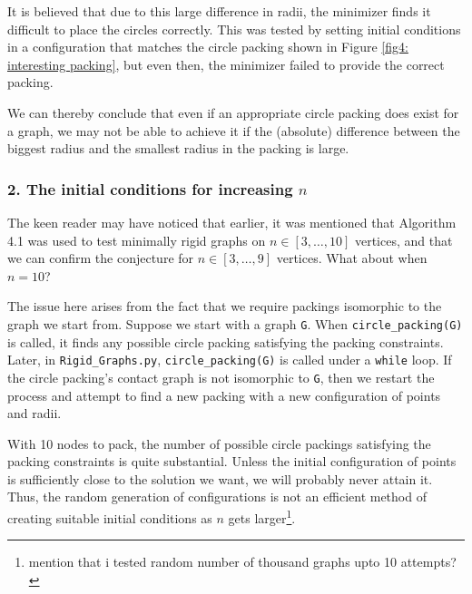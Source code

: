 \vspace{-5mm}
\begin{flushleft}
It is believed that due to this large difference in radii, the minimizer finds it difficult to place the circles correctly. This was tested by setting initial conditions in a configuration that matches the circle packing shown in Figure \ref{fig4: interesting packing}, but even then, the minimizer failed to provide the correct packing. 
\end{flushleft}

\begin{flushleft}
We can thereby conclude that even if an appropriate circle packing does exist for a graph, we may not be able to achieve it if the (absolute) difference between the biggest radius and the smallest radius in the packing is large. 
\end{flushleft}

\subsubsection{2. The initial conditions for increasing $n$}

\begin{flushleft}
The keen reader may have noticed that earlier, it was mentioned that Algorithm 4.1 was used to test minimally rigid graphs on $n \in [3, \hdots, 10]$ vertices, and that we can confirm the conjecture for $n \in [3, \hdots, 9]$ vertices. What about when $n = 10$?
\end{flushleft}

\begin{flushleft}
The issue here arises from the fact that we require packings isomorphic to the graph we start from. Suppose we start with a graph \texttt{G}. When \texttt{circle\_packing(G)} is called, it finds any possible circle packing satisfying the packing constraints. Later, in \texttt{Rigid\_Graphs.py}, \texttt{circle\_packing(G)} is called under a \texttt{while} loop. If the circle packing's contact graph is not isomorphic to \texttt{G}, then we restart the process and attempt to find a new packing with a new configuration of points and radii. 
\end{flushleft}

\begin{flushleft}
With 10 nodes to pack, the number of possible circle packings satisfying the packing constraints is quite substantial. Unless the initial configuration of points is sufficiently close to the solution we want, we will probably never attain it. Thus, the random generation of configurations is not an efficient method of creating suitable initial conditions as $n$ gets larger\footnote{mention that i tested random number of thousand graphs upto 10 attempts?}.
\end{flushleft}

